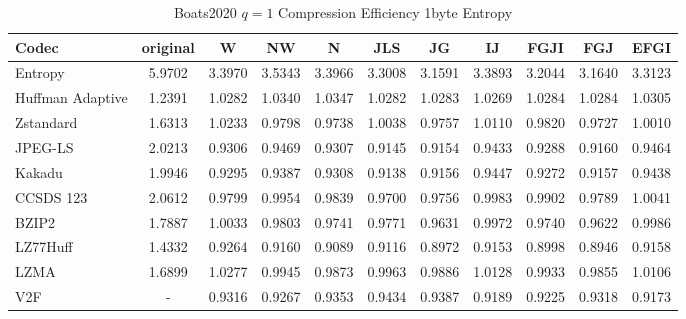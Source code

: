 \documentclass{article}
\begin{document}
\begin{table}[h!]
    \centering
    \caption{Boats2020 $q=1$ Compression Efficiency 1byte Entropy}
    \begin{tabular}{|l|cccccccccc|}
        \hline
        Codec &  original &      W &     NW &      N &    JLS &     JG &     IJ &   FGJI &    FGJ &   EFGI \\ \hline
        Entropy & 5.9702 & 3.3970 & 3.5343 & 3.3966 & 3.3008 & 3.1591 & 3.3893 & 3.2044 & 3.1640 & 3.3123 \\ \hline
Huffman Adaptive                                &    1.2391 & 1.0282 & 1.0340 & 1.0347 & 1.0282 & 1.0283 & 1.0269 & 1.0284 & 1.0284 & 1.0305 \\
Zstandard                              &    1.6313 & 1.0233 & 0.9798 & 0.9738 & 1.0038 & 0.9757 & 1.0110 & 0.9820 & 0.9727 & 1.0010 \\
JPEG-LS                                &    2.0213 & 0.9306 & 0.9469 & 0.9307 & 0.9145 & 0.9154 & 0.9433 & 0.9288 & 0.9160 & 0.9464 \\
Kakadu                         &    1.9946 & 0.9295 & 0.9387 & 0.9308 & 0.9138 & 0.9156 & 0.9447 & 0.9272 & 0.9157 & 0.9438 \\
CCSDS 123 &    2.0612 & 0.9799 & 0.9954 & 0.9839 & 0.9700 & 0.9756 & 0.9983 & 0.9902 & 0.9789 & 1.0041 \\
BZIP2                                 &    1.7887 & 1.0033 & 0.9803 & 0.9741 & 0.9771 & 0.9631 & 0.9972 & 0.9740 & 0.9622 & 0.9986 \\
LZ77Huff                         &    1.4332 & 0.9264 & 0.9160 & 0.9089 & 0.9116 & 0.8972 & 0.9153 & 0.8998 & 0.8946 & 0.9158 \\
LZMA                              &    1.6899 & 1.0277 & 0.9945 & 0.9873 & 0.9963 & 0.9886 & 1.0128 & 0.9933 & 0.9855 & 1.0106 \\
V2F                       &    - & 0.9316 & 0.9267 & 0.9353 & 0.9434 & 0.9387 & 0.9189 & 0.9225 & 0.9318 & 0.9173 \\
        \hline
    \end{tabular}
\end{table}
\end{document}
